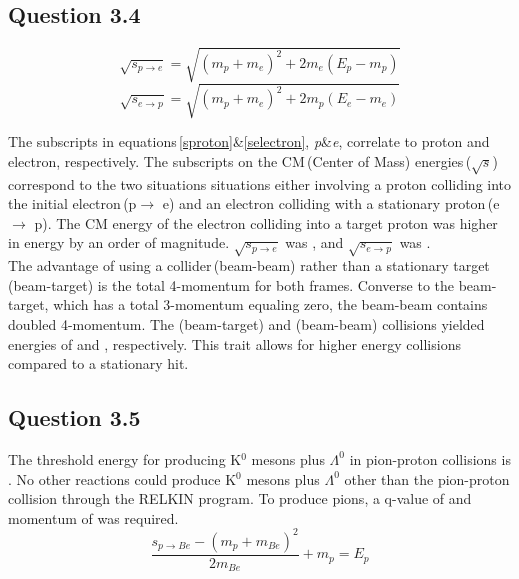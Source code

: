 \documentclass[aps,prl,twocolumn,superscriptaddress,nofootinbib]{revtex4-1}
\begin{document}
\subsection{Question 3.4}
\begin{equation}
\sqrt{s_{p\rightarrow e}}=\sqrt{(m_p+m_e)^2+2m_e(E_p-m_p)}
\label{sproton}
\end{equation}
\begin{equation}
\sqrt{s_{e\rightarrow p}}=\sqrt{(m_p+m_e)^2+2m_p(E_e-m_e)}
\label{selectron}
\end{equation}

The subscripts in equations\,\ref{sproton}\&\ref{selectron}, \textit{p}\&\textit{e}, correlate to proton and electron,
 respectively. The subscripts on the CM\,(Center of Mass) energies\,($\sqrt{s}$) correspond to the two situations situations 
 either involving a proton colliding into the initial electron\,(p$\rightarrow$ e) and an electron colliding with a 
 stationary proton\,(e$\rightarrow$ p). The CM energy of the electron colliding into a target proton was higher in energy by 
 an order of magnitude. $\sqrt{s_{p\rightarrow e}}$ was , and $\sqrt{s_{e\rightarrow p}}$ 
 was .
\\
\indent The advantage of using a collider\,(beam-beam) rather than a stationary target\,(beam-target) is the total 4-momentum for both frames. Converse to the beam-target, which has a total 3-momentum equaling zero, the beam-beam contains doubled 4-momentum. The (beam-target) and (beam-beam) collisions yielded energies of  and , respectively. This trait allows for higher energy collisions compared to a stationary hit.


\subsection{Question 3.5}
The threshold energy for producing K$^0$ mesons plus $\Lambda^0$ in pion-proton collisions is . No other reactions could produce K$^0$ mesons plus $\Lambda^0$ other than the pion-proton collision through the RELKIN program. To produce pions, a q-value of  and momentum of  was required.
\\
\begin{equation}
\frac{s_{p\rightarrow Be}-(m_p+m_{Be})^2}{2m_{Be}}+m_p=E_p
\label{Be}
\end{equation}
\end{document}
